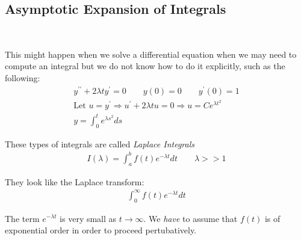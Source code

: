 \subsection{Asymptotic Expansion of Integrals}\hfill\\
\par\bigskip
\noindent This might happen when we solve a differential equation when we may need to compute an integral but we do not know how to do it explicitly, such as the following:
\begin{equation*}
  \begin{gathered}
    y^{\prime\prime}+2\lambda ty^{\prime} = 0\qquad y(0) = 0 \qquad y^{\prime}(0) = 1\\
    \text{Let } u = y^{\prime}\Rightarrow u^{\prime} +2\lambda tu = 0\Rightarrow u = Ce^{\lambda t^2}\\
    y = \int_{0}^{t}e^{\lambda s^2}ds
  \end{gathered}
\end{equation*}
\par\bigskip
\noindent These types of integrals are called \textit{Laplace Integrals} 
\begin{equation*}
  \begin{gathered}
    I(\lambda) = \int_{a}^{b}f(t)e^{-\lambda t}dt\qquad\lambda>>1
  \end{gathered}
\end{equation*}\par
\noindent They look like the Laplace transform:
\begin{equation*}
  \begin{gathered}
    \int_{0}^{\infty}f(t)e^{-\lambda t}dt
  \end{gathered}
\end{equation*}
\par\bigskip
\noindent The term $e^{-\lambda t}$ is very small as $t\to\infty$. We \textit{have} to assume that $f(t)$ is of exponential order in order to proceed pertubatively.
\par\bigskip
